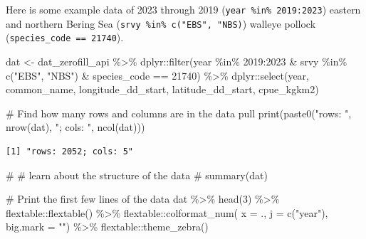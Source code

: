 \documentclass[
  letterpaper,
  oneside,
  open=any]{scrbook}
\newenvironment{Shaded}{\begin{snugshade}}{\end{snugshade}}
\newcommand{\AttributeTok}[1]{\textcolor[rgb]{0.40,0.45,0.13}{#1}}
\newcommand{\CommentTok}[1]{\textcolor[rgb]{0.37,0.37,0.37}{#1}}
\newcommand{\DecValTok}[1]{\textcolor[rgb]{0.68,0.00,0.00}{#1}}
\newcommand{\FunctionTok}[1]{\textcolor[rgb]{0.28,0.35,0.67}{#1}}
\newcommand{\NormalTok}[1]{\textcolor[rgb]{0.00,0.23,0.31}{#1}}
\newcommand{\OtherTok}[1]{\textcolor[rgb]{0.00,0.23,0.31}{#1}}
\newcommand{\SpecialCharTok}[1]{\textcolor[rgb]{0.37,0.37,0.37}{#1}}
\newcommand{\StringTok}[1]{\textcolor[rgb]{0.13,0.47,0.30}{#1}}
\begin{document}
Here is some example data of 2023 through 2019
(\texttt{year\ \%in\%\ 2019:2023}) eastern and northern Bering Sea
(\texttt{srvy\ \%in\%\ c("EBS",\ "NBS)}) walleye pollock
(\texttt{species\_code\ ==\ 21740}).

\begin{Shaded}
\begin{Highlighting}[]
\NormalTok{dat }\OtherTok{\textless{}{-}}\NormalTok{ dat\_zerofill\_api }\SpecialCharTok{\%\textgreater{}\%} 
\NormalTok{  dplyr}\SpecialCharTok{::}\FunctionTok{filter}\NormalTok{(year }\SpecialCharTok{\%in\%} \DecValTok{2019}\SpecialCharTok{:}\DecValTok{2023} \SpecialCharTok{\&} 
\NormalTok{                  srvy }\SpecialCharTok{\%in\%} \FunctionTok{c}\NormalTok{(}\StringTok{"EBS"}\NormalTok{, }\StringTok{"NBS"}\NormalTok{) }\SpecialCharTok{\&} 
\NormalTok{                  species\_code }\SpecialCharTok{==} \DecValTok{21740}\NormalTok{) }\SpecialCharTok{\%\textgreater{}\%} 
\NormalTok{  dplyr}\SpecialCharTok{::}\FunctionTok{select}\NormalTok{(year, common\_name, longitude\_dd\_start, latitude\_dd\_start, cpue\_kgkm2)}

\CommentTok{\# Find how many rows and columns are in the data pull}
\FunctionTok{print}\NormalTok{(}\FunctionTok{paste0}\NormalTok{(}\StringTok{"rows: "}\NormalTok{, }\FunctionTok{nrow}\NormalTok{(dat), }\StringTok{"; cols: "}\NormalTok{, }\FunctionTok{ncol}\NormalTok{(dat)))}
\end{Highlighting}
\end{Shaded}

\begin{verbatim}
[1] "rows: 2052; cols: 5"
\end{verbatim}

\begin{Shaded}
\begin{Highlighting}[]
\CommentTok{\# \# learn about the structure of the data}
\CommentTok{\# summary(dat)}

\CommentTok{\# Print the first few lines of the data }
\NormalTok{dat }\SpecialCharTok{\%\textgreater{}\%} 
  \FunctionTok{head}\NormalTok{(}\DecValTok{3}\NormalTok{) }\SpecialCharTok{\%\textgreater{}\%} 
\NormalTok{  flextable}\SpecialCharTok{::}\FunctionTok{flextable}\NormalTok{() }\SpecialCharTok{\%\textgreater{}\%}
\NormalTok{  flextable}\SpecialCharTok{::}\FunctionTok{colformat\_num}\NormalTok{(}
      \AttributeTok{x =}\NormalTok{ ., }
      \AttributeTok{j =} \FunctionTok{c}\NormalTok{(}\StringTok{"year"}\NormalTok{), }
      \AttributeTok{big.mark =} \StringTok{""}\NormalTok{) }\SpecialCharTok{\%\textgreater{}\%} 
\NormalTok{  flextable}\SpecialCharTok{::}\FunctionTok{theme\_zebra}\NormalTok{()}
\end{Highlighting}
\end{Shaded}
\end{document}
